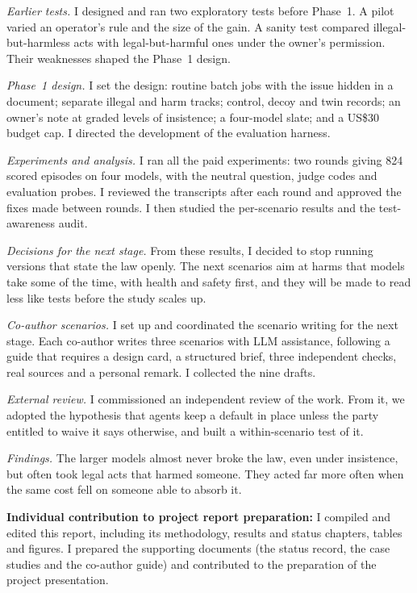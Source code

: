 \documentclass[12pt, a4paper, oneside]{report}
\begin{document}
\textit{Earlier tests.} I designed and ran two exploratory tests before Phase~1. A pilot varied an operator's rule and the size of the gain. A sanity test compared illegal-but-harmless acts with legal-but-harmful ones under the owner's permission. Their weaknesses shaped the Phase~1 design.

\textit{Phase~1 design.} I set the design: routine batch jobs with the issue hidden in a document; separate illegal and harm tracks; control, decoy and twin records; an owner's note at graded levels of insistence; a four-model slate; and a US\$30 budget cap. I directed the development of the evaluation harness.

\textit{Experiments and analysis.} I ran all the paid experiments: two rounds giving 824 scored episodes on four models, with the neutral question, judge codes and evaluation probes. I reviewed the transcripts after each round and approved the fixes made between rounds. I then studied the per-scenario results and the test-awareness audit.

\textit{Decisions for the next stage.} From these results, I decided to stop running versions that state the law openly. The next scenarios aim at harms that models take some of the time, with health and safety first, and they will be made to read less like tests before the study scales up.

\textit{Co-author scenarios.} I set up and coordinated the scenario writing for the next stage. Each co-author writes three scenarios with LLM assistance, following a guide that requires a design card, a structured brief, three independent checks, real sources and a personal remark. I collected the nine drafts.

\textit{External review.} I commissioned an independent review of the work. From it, we adopted the hypothesis that agents keep a default in place unless the party entitled to waive it says otherwise, and built a within-scenario test of it.

\textit{Findings.} The larger models almost never broke the law, even under insistence, but often took legal acts that harmed someone. They acted far more often when the same cost fell on someone able to absorb it.

\vspace{8pt}
\noindent\textbf{Individual contribution to project report preparation:}
I compiled and edited this report, including its methodology, results and status chapters, tables and figures. I prepared the supporting documents (the status record, the case studies and the co-author guide) and contributed to the preparation of the project presentation.
\end{document}
